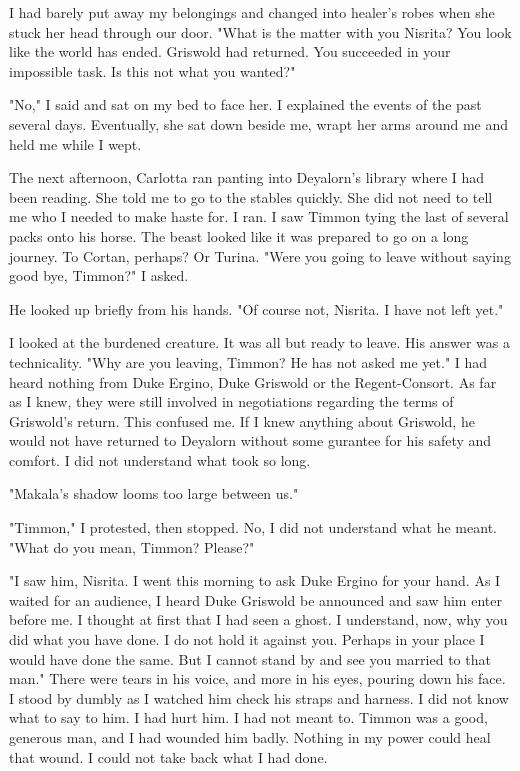 \documentclass{article}
\begin{document}
I had barely put away my belongings and changed into healer's robes when she stuck her head through our door. "What is the matter with you Nisrita? You look like the world has ended. Griswold had returned. You succeeded in your impossible task. Is this not what you wanted?"

"No," I said and sat on my bed to face her. I explained the events of the past several days. Eventually, she sat down beside me, wrapt her arms around me and held me while I wept. 

The next afternoon, Carlotta ran panting into Deyalorn's library where I had been reading. She told me to go to the stables quickly. She did not need to tell me who I needed to make haste for. I ran. I saw Timmon tying the last of several packs onto his horse. The beast looked like it was prepared to go on a long journey. To Cortan, perhaps? Or Turina. "Were you going to leave without saying good bye, Timmon?" I asked.

He looked up briefly from his hands. "Of course not, Nisrita. I have not left yet." 

I looked at the burdened creature. It was all but ready to leave. His answer was a technicality. "Why are you leaving, Timmon? He has not asked me yet." I had heard nothing from Duke Ergino, Duke Griswold or the Regent-Consort. As far as I knew, they were still involved in negotiations regarding the terms of Griswold's return. This confused me. If I knew anything about Griswold, he would not have returned to Deyalorn without some gurantee for his safety and comfort. I did not understand what took so long. 

"Makala's shadow looms too large between us."

"Timmon," I protested, then stopped. No, I did not understand what he meant. "What do you mean, Timmon? Please?"

"I saw him, Nisrita. I went this morning to ask Duke Ergino for your hand. As I waited for an audience, I heard Duke Griswold be announced and saw him enter before me. I thought at first that I had seen a ghost. I understand, now, why you did what you have done. I do not hold it against you. Perhaps in your place I would have done the same. But I cannot stand by and see you married to that man." There were tears in his voice, and more in his eyes, pouring down his face. I stood by dumbly as I watched him check his straps and harness. I did not know what to say to him. I had hurt him. I had not meant to. Timmon was a good, generous man, and I had wounded him badly. Nothing in my power could heal that wound. I could not take back what I had done.
\end{document}
